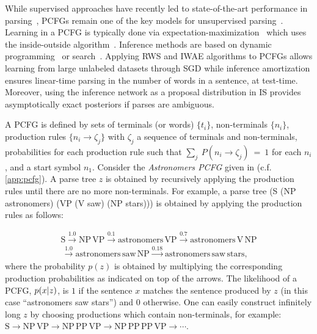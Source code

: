 While supervised approaches have recently led to state-of-the-art performance in parsing~\citep{Chen2014fast}, \glspl{PCFG} remain one of the key models for unsupervised parsing~\citep{Manning1999foundations}.
Learning in a \gls{PCFG} is typically done via expectation-maximization~\citep{Dempster1977maximum} which uses the inside-outside algorithm~\citep{Lari1990estimation}.
Inference methods are based on dynamic programming~\citep{Younger1967recognition,Earley1970efficient} or search~\citep{Klein2003parsing}.
Applying \gls{RWS} and \gls{IWAE} algorithms to \glspl{PCFG} allows learning from large unlabeled datasets through \gls{SGD} while inference amortization ensures linear-time parsing in the number of words in a sentence, at test-time.
Moreover, using the inference network as a proposal distribution in \gls{IS} provides asymptotically exact posteriors if parses are ambiguous.

A \gls{PCFG} is defined by sets of terminals (or words) $\{t_i\}$, non-terminals $\{n_i\}$, production rules $\{n_i \to \zeta_j\}$ with $\zeta_j$ a sequence of terminals and non-terminals, probabilities for each production rule such that $\sum_j~P\left(n_i \!\to\! \zeta_j\right)~=~1$ for each $n_i$, and a start symbol $n_1$.
Consider the \emph{Astronomers \gls{PCFG}} given in \citet[Table
11.2]{Manning1999foundations} (c.f. \cref{app:pcfg}).
A parse tree $z$ is obtained by recursively applying the production rules until there are no more non-terminals.
For example, a parse tree (S (NP astronomers) (VP (V saw) (NP stars))) is obtained by applying the production rules as follows:

\par\nobreak\vspace{-1.2em}
{\small
\begin{align*}
  \text{S} \xrightarrow{1.0} \text{NP}\,\text{VP} \xrightarrow{0.1} \text{astronomers}\,\text{VP} \xrightarrow{0.7} \text{astronomers}\,\text{V}\,\text{NP} \\
  \,\xrightarrow{1.0} \text{astronomers}\,\text{saw}\,\text{NP} \xrightarrow{0.18} \text{astronomers}\,\text{saw}\,\text{stars},
\end{align*}
}%
where the probability $p(z)$ is obtained by multiplying the corresponding production probabilities as indicated on top of the arrows.
The likelihood of a \gls{PCFG}, $p(x \lvert z)$, is $1$ if the sentence $x$ matches the sentence produced by $z$ (in this case ``astronomers saw stars'') and $0$ otherwise.
One can easily construct infinitely long $z$ by choosing productions which contain non-terminals, for example: $\text{S} \to \text{NP}\,\text{VP} \to \text{NP}\,\text{PP}\,\text{VP} \to \text{NP}\,\text{PP}\,\text{PP}\,\text{VP} \to \cdots$.


